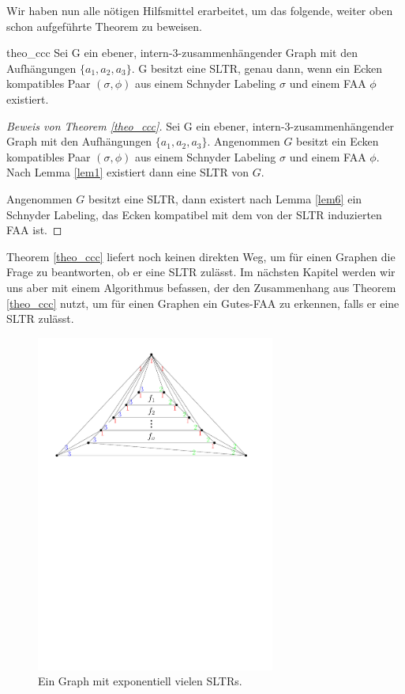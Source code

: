 Wir haben nun alle nötigen Hilfsmittel erarbeitet, um das folgende, weiter oben schon aufgeführte Theorem zu beweisen.

\begin{reptheorem}{theo_ccc}
Sei G ein ebener, intern-3-zusammenhängender Graph mit den Aufhängungen $\{a_1,a_2,a_3\}$. G besitzt eine SLTR, genau dann, wenn ein Ecken kompatibles Paar $(\sigma,\phi)$ aus einem Schnyder Labeling $\sigma$ und einem FAA $\phi$ existiert.
\end{reptheorem}

\begin{proof}[Beweis von Theorem \ref{theo_ccc}]
Sei G ein ebener, intern-3-zusammenhängender Graph mit den Aufhängungen $\{a_1,a_2,a_3\}$. Angenommen $G$ besitzt ein Ecken kompatibles Paar $(\sigma,\phi)$ aus einem Schnyder Labeling $\sigma$ und einem FAA $\phi$. Nach Lemma \ref{lem1} existiert dann eine SLTR von $G$. 

Angenommen $G$ besitzt eine SLTR, dann existert nach Lemma \ref{lem6} ein Schnyder Labeling, das Ecken kompatibel mit dem von der SLTR induzierten FAA ist.
\end{proof}

Theorem \ref{theo_ccc} liefert noch keinen direkten Weg, um für einen Graphen die Frage zu beantworten, ob er eine SLTR zulässt. Im nächsten Kapitel werden wir uns aber mit einem Algorithmus befassen, der den Zusammenhang aus Theorem \ref{theo_ccc} nutzt, um für einen Graphen ein Gutes-FAA zu erkennen, falls er eine SLTR zulässt.

\begin{figure}[b!]
	\centering
  \includegraphics[width=0.7\textwidth]{exp_many_sltr.pdf}
  \caption{Ein Graph mit exponentiell vielen SLTRs.}
  \label{exp_many_sltr}
\end{figure}

